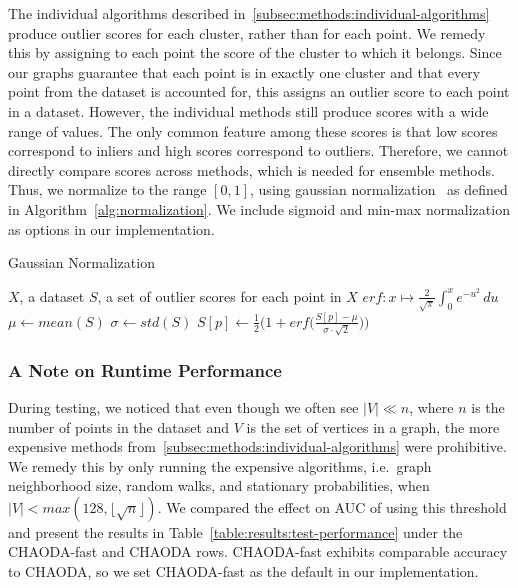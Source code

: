 The individual algorithms described in~\ref{subsec:methods:individual-algorithms} produce outlier scores for each cluster, rather than for each point.
We remedy this by assigning to each point the score of the cluster to which it belongs.
Since our graphs guarantee that each point is in exactly one cluster and that every point from the dataset is accounted for, this assigns an outlier score to each point in a dataset.
However, the individual methods still produce scores with a wide range of values.
The only common feature among these scores is that low scores correspond to inliers and high scores correspond to outliers.
Therefore, we cannot directly compare scores across methods, which is needed for ensemble methods.
Thus, we normalize to the range $[0, 1]$, using gaussian normalization~\cite{kriegel2011interpreting} as defined in Algorithm~\ref{alg:normalization}.
We include sigmoid and min-max normalization as options in our implementation.

\begin{algorithm}[h]
    \caption{Gaussian Normalization}
    \label{alg:normalization}
\begin{algorithmic}[1]
    \REQUIRE $X$, a dataset
    \REQUIRE $S$, a set of outlier scores for each point in $X$
    \STATE $erf: x \mapsto \frac{2}{\sqrt{\pi}} \int_{0}^{x} e^{-u^2} \,du $
    \STATE $\mu \gets mean(S)$
    \STATE $\sigma \gets std(S)$
        \STATE $S[p] \gets \frac{1}{2} \Big( 1 + erf \big(\frac{S[p] - \mu}{\sigma \cdot \sqrt{2}}\big) \Big) $
    \ENDFOR
\end{algorithmic}
\end{algorithm}

\subsubsection{A Note on Runtime Performance}

During testing, we noticed that even though we often see $|V| \ll n $, where $n$ is the number of points in the dataset and $V$ is the set of vertices in a graph, the more expensive methods from~\ref{subsec:methods:individual-algorithms} were prohibitive.
We remedy this by only running the expensive algorithms, i.e.\ graph neighborhood size, random walks, and stationary probabilities, when $|V| < max(128, \lfloor \sqrt n \rfloor)$.
We compared the effect on AUC of using this threshold and present the results in Table~\ref{table:results:test-performance} under the CHAODA-fast and CHAODA rows.
CHAODA-fast exhibits comparable accuracy to CHAODA, so we
set CHAODA-fast as the default in our implementation.


